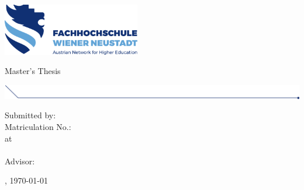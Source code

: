 
\makeatletter

\begin{titlepage}

  \includegraphics[width=6cm]{images/fhwn-logo.png}

  \vspace{70pt}
  {\noindent \linespread{1.3} \color{header-blue} \Huge \textbf{\@title} \par }
  \vspace{5pt}
  {\noindent\LARGE Master's Thesis \par}
  \vspace{20pt}

  \hspace{-35mm}
  \includegraphics[width=18.67cm]{images/titlepage-line.png}

  \vspace{15pt}

  \tabto{2cm}Submitted by: \tabto{7cm}\textbf{\@author} \\
  \tabto{2cm}Matriculation No.: \tabto{7cm}\textbf{\matriculationNumber} \\
  \vspace{15pt}
  \tabto{2cm}at \tabto{7cm}\textbf{\study}\\
  \tabto{7cm}\textbf{\institutename}
  \tabto{7cm}\textbf{\studyprogram} \\
  \vspace{15pt}
  \tabto{2cm}Advisor: \tabto{7cm}\textbf{\advisor}

  \vfill

  \place, \today
      
\end{titlepage}
\makeatother

